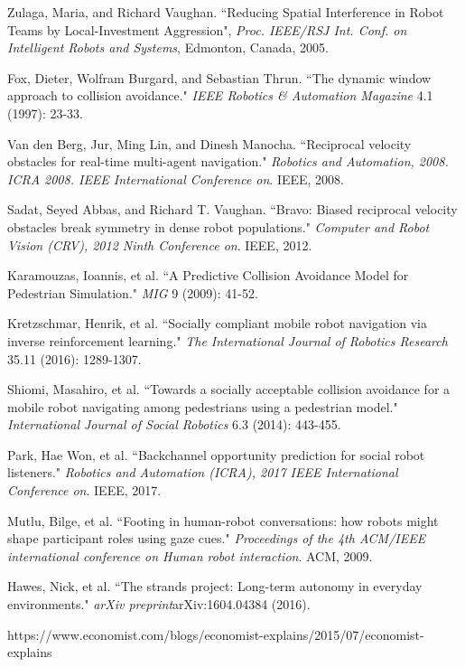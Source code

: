 \documentclass[letterpaper, 10 pt, conference]{ieeeconf}  %
\begin{document}
\begin{thebibliography}{99}

 Zulaga, Maria, and Richard Vaughan. ``Reducing Spatial Interference in Robot Teams by Local-Investment Aggression", \textit{Proc. IEEE/RSJ Int. Conf. on Intelligent Robots and Systems}, Edmonton, Canada, 2005.

 Fox, Dieter, Wolfram Burgard, and Sebastian Thrun. ``The dynamic window approach to collision avoidance." \textit{IEEE Robotics & Automation Magazine} 4.1 (1997): 23-33.

 Van den Berg, Jur, Ming Lin, and Dinesh Manocha. ``Reciprocal velocity obstacles for real-time multi-agent navigation." \textit{Robotics and Automation, 2008. ICRA 2008. IEEE International Conference on}. IEEE, 2008.

 Sadat, Seyed Abbas, and Richard T. Vaughan. ``Bravo: Biased reciprocal velocity obstacles break symmetry in dense robot populations." \textit{Computer and Robot Vision (CRV), 2012 Ninth Conference on}. IEEE, 2012.

 Karamouzas, Ioannis, et al. ``A Predictive Collision Avoidance Model for Pedestrian Simulation." \textit{MIG} 9 (2009): 41-52.

 Kretzschmar, Henrik, et al. ``Socially compliant mobile robot navigation via inverse reinforcement learning." \textit{The International Journal of Robotics Research} 35.11 (2016): 1289-1307.

 Shiomi, Masahiro, et al. ``Towards a socially acceptable collision avoidance for a mobile robot navigating among pedestrians using a pedestrian model." \textit{International Journal of Social Robotics} 6.3 (2014): 443-455.

 Park, Hae Won, et al. ``Backchannel opportunity prediction for social robot listeners." \textit{Robotics and Automation (ICRA), 2017 IEEE International Conference on}. IEEE, 2017.

 Mutlu, Bilge, et al. ``Footing in human-robot conversations: how robots might shape participant roles using gaze cues." \textit{Proceedings of the 4th ACM/IEEE international conference on Human robot interaction}. ACM, 2009.


 Hawes, Nick, et al. ``The strands project: Long-term autonomy in everyday environments." \textit{arXiv preprint}arXiv:1604.04384 (2016).

 https://www.economist.com/blogs/economist-explains/2015/07/economist-explains 

\end{thebibliography}
\end{document}
